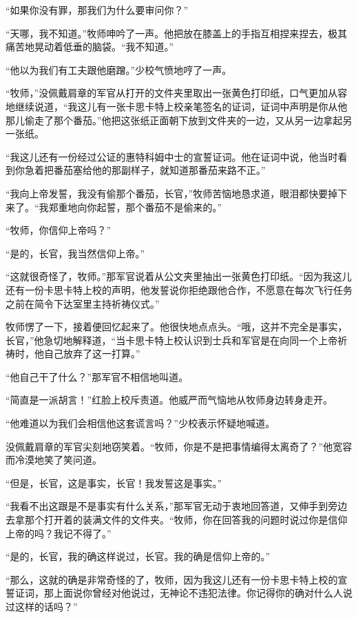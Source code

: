     “如果你没有罪，那我们为什么要审问你？”

    “天哪，我不知道。”牧师呻吟了一声。他把放在膝盖上的手指互相捏来捏去，极其痛苦地晃动着低垂的脑袋。“我不知道。”

    “他以为我们有工夫跟他磨蹭。”少校气愤地哼了一声。

    “牧师，”没佩戴肩章的军官从打开的文件夹里取出一张黄色打印纸，口气更加从容地继续说道，“我这儿有一张卡思卡特上校亲笔签名的证词，证词中声明是你从他那儿偷走了那个番茄。”他把这张纸正面朝下放到文件夹的一边，又从另一边拿起另一张纸。

    “我这儿还有一份经过公证的惠特科姆中士的宣誓证词。他在证词中说，他当时看到你急着把番茄塞给他的那副样子，就知道那番茄来路不正。”
 


    “我向上帝发誓，我没有偷那个番茄，长官，”牧师苦恼地恳求道，眼泪都快要掉下来了。“我郑重地向你起誓，那个番茄不是偷来的。”

    “牧师，你信仰上帝吗？”

    “是的，长官，我当然信仰上帝。”

    “这就很奇怪了，牧师。”那军官说着从公文夹里抽出一张黄色打印纸。“因为我这儿还有一份卡思卡特上校的声明，他发誓说你拒绝跟他合作，不愿意在每次飞行任务之前在简令下达室里主持祈祷仪式。”

    牧师愣了一下，接着便回忆起来了。他很快地点点头。“哦，这并不完全是事实，长官，”他急切地解释道，“当卡思卡特上校认识到士兵和军官是在向同一个上帝祈祷时，他自己放弃了这一打算。”

    “他自己干了什么？”那军官不相信地叫道。

    “简直是一派胡言！”红脸上校斥责道。他威严而气恼地从牧师身边转身走开。

    “他难道以为我们会相信他这套谎言吗？”少校表示怀疑地喊道。

    没佩戴肩章的军官尖刻地窃笑着。“牧师，你是不是把事情编得太离奇了？”他宽容而冷漠地笑了笑问道。

    “但是，长官，这是事实，长官！我发誓这是事实。”

    “我看不出这跟是不是事实有什么关系，”那军官无动于衷地回答道，又伸手到旁边去拿那个打开着的装满文件的文件夹。“牧师，你在回答我的问题时说过你是信仰上帝的吗？我记不得了。”

    “是的，长官，我的确这样说过，长官。我的确是信仰上帝的。”

    “那么，这就的确是非常奇怪的了，牧师，因为我这儿还有一份卡思卡特上校的宣誓证词，那上面说你曾经对他说过，无神论不违犯法律。你记得你的确对什么人说过这样的话吗？”

